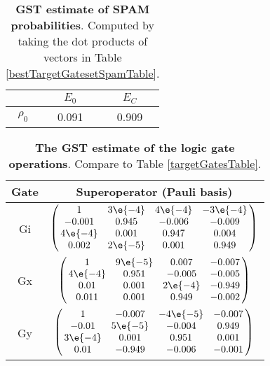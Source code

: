 {\begin{table}[h]
\begin{center}
\begin{tabular}[l]{|c|c|c|}
\hline
 & $E_{0}$ & $E_C$ \\ \hline
$\rho_{0}$ & 0.091 & 0.909 \\ \hline
\end{tabular}

\caption{\textbf{GST estimate of SPAM probabilities}.  Computed by taking the dot products of vectors in Table \ref{bestTargetGatesetSpamTable}.\label{bestTargetGatesetSpamParametersTable}}
\end{center}
\end{table}

\begin{table}[h]
\begin{center}
\begin{tabular}[l]{|c|c|}
\hline
Gate & Superoperator (Pauli basis) \\ \hline
Gi & $ \left(\!\!\begin{array}{cccc}
1 & 3\e{-4} & 4\e{-4} & -3\e{-4} \\ 
-0.001 & 0.945 & -0.006 & -0.009 \\ 
4\e{-4} & 0.001 & 0.947 & 0.004 \\ 
0.002 & 2\e{-5} & 0.001 & 0.949
 \end{array}\!\!\right) $
 \\ \hline
Gx & $ \left(\!\!\begin{array}{cccc}
1 & 9\e{-5} & 0.007 & -0.007 \\ 
4\e{-4} & 0.951 & -0.005 & -0.005 \\ 
0.01 & 0.001 & 2\e{-4} & -0.949 \\ 
0.011 & 0.001 & 0.949 & -0.002
 \end{array}\!\!\right) $
 \\ \hline
Gy & $ \left(\!\!\begin{array}{cccc}
1 & -0.007 & -4\e{-5} & -0.007 \\ 
-0.01 & 5\e{-5} & -0.004 & 0.949 \\ 
3\e{-4} & 0.001 & 0.951 & 0.001 \\ 
0.01 & -0.949 & -0.006 & -0.001
 \end{array}\!\!\right) $
 \\ \hline
\end{tabular}

\caption{\textbf{The GST estimate of the logic gate operations}.  Compare to Table \ref{targetGatesTable}.\label{bestTargetGatesetGatesTable}}
\end{center}
\end{table}

}
